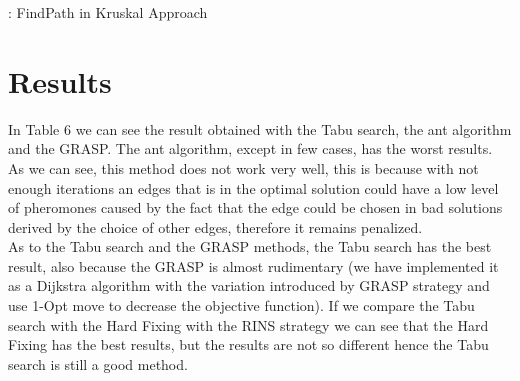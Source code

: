 \begin{algorithm}[H]
\caption{: FindPath in Kruskal Approach} \label{alg:SC}
\begin{algorithmic} 
\REPEAT
{}
\end{algorithmic}
\end{algorithm}

\section{Results}
In Table 6 we can see the result obtained with the Tabu search, the ant algorithm and the GRASP. The ant algorithm, except in few cases, has the worst results.\\
As we can see, this method does not work very well, this is because with not enough iterations an edges that is in the optimal solution could have a low level of pheromones caused by the fact that the edge could be chosen in bad solutions derived by the choice of other edges, therefore it remains penalized.\\
As to the Tabu search and the GRASP methods, the Tabu search has the best result, also because the GRASP is almost rudimentary (we have implemented it as a Dijkstra algorithm with the variation introduced by GRASP strategy and use 1-Opt move to decrease the objective function). If we compare the Tabu search with the Hard Fixing with the RINS strategy we can see that the Hard Fixing has the best results, but the results are not so different hence the Tabu search is still a good method.\\

